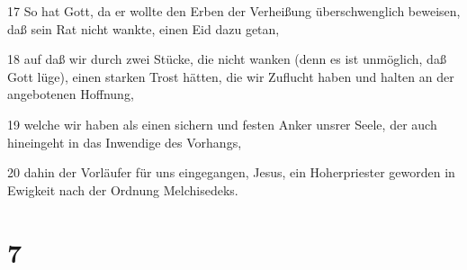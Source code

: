 \par 17 So hat Gott, da er wollte den Erben der Verheißung überschwenglich beweisen, daß sein Rat nicht wankte, einen Eid dazu getan,
\par 18 auf daß wir durch zwei Stücke, die nicht wanken (denn es ist unmöglich, daß Gott lüge), einen starken Trost hätten, die wir Zuflucht haben und halten an der angebotenen Hoffnung,
\par 19 welche wir haben als einen sichern und festen Anker unsrer Seele, der auch hineingeht in das Inwendige des Vorhangs,
\par 20 dahin der Vorläufer für uns eingegangen, Jesus, ein Hoherpriester geworden in Ewigkeit nach der Ordnung Melchisedeks.

\chapter{7}

